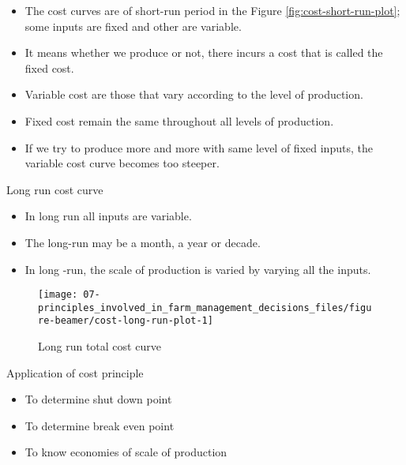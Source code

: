 \documentclass[12pt,ignorenonframetext,aspectratio=169]{beamer}
\providecommand{\tightlist}{%
  \setlength{\itemsep}{0pt}\setlength{\parskip}{0pt}}
\begin{document}
\begin{frame}{}
\protect\hypertarget{section-2}{}
\begin{itemize}
\tightlist
\item
  The cost curves are of short-run period in the Figure
  \ref{fig:cost-short-run-plot}; some inputs are fixed and other are
  variable.
\item
  It means whether we produce or not, there incurs a cost that is called
  the fixed cost.
\item
  Variable cost are those that vary according to the level of
  production.
\item
  Fixed cost remain the same throughout all levels of production.
\item
  If we try to produce more and more with same level of fixed inputs,
  the variable cost curve becomes too steeper.
\end{itemize}
\end{frame}

\begin{frame}{Long run cost curve}
\protect\hypertarget{long-run-cost-curve}{}
\begin{itemize}
\tightlist
\item
  In long run all inputs are variable.
\item
  The long-run may be a month, a year or decade.
\item
  In long -run, the scale of production is varied by varying all the
  inputs.
\end{itemize}

\begin{figure}
\texttt{[image: 07-principles\_involved\_in\_farm\_management\_decisions\_files/figure-beamer/cost-long-run-plot-1]} \caption{Long run total cost curve}\label{fig:cost-long-run-plot}
\end{figure}
\end{frame}

\begin{frame}{Application of cost principle}
\protect\hypertarget{application-of-cost-principle}{}
\begin{itemize}
\tightlist
\item
  To determine shut down point
\item
  To determine break even point
\item
  To know economies of scale of production
\end{itemize}
\end{frame}
\end{document}
